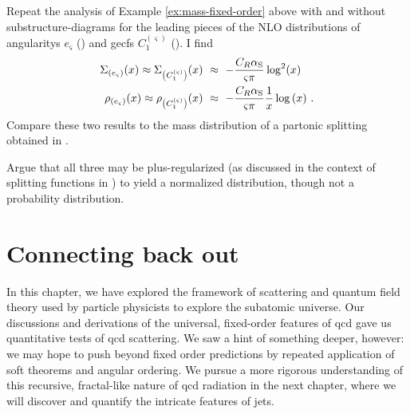 \begin{exercise}{}
    Repeat the analysis of Example \ref{ex:mass-fixed-order} above with and without \glspl{substructure-diagram} for the leading pieces of the NLO distributions of \glspl{angularity} \(e_\varsigma\) () and \glspl{gecf} \(C_1^{(\varsigma)}\) ().
    I find
    \begin{align}
        \Sigma_{\left(e_\varsigma\right)}(x)
        \approx
        \Sigma_{\left(C_1^{(\varsigma)}\right)}(x)
        \,\,
        &\approx
        \,\,
        -\frac{C_R\alpha_{\rm S}}{\varsigma \pi}\log^2(x)
        \\
        \rho_{\left(e_\varsigma\right)}(x)
        \approx
        \rho_{\left(C_1^{(\varsigma)}\right)}(x)
        \,\,
        &\approx
        \,\,
        -\frac{C_R\alpha_{\rm S}}{\varsigma \pi} \frac{1}{x}
        \log\left(x\right)
        \,.
    \end{align}
    Compare these two results to the mass distribution of a partonic splitting obtained in .

    Argue that all three may be plus-regularized (as discussed in the context of splitting functions in ) to yield a normalized distribution, though not a probability distribution.
\end{exercise}




\section{Connecting back out}

In this chapter, we have explored the framework of scattering and quantum field theory used by particle physicists to explore the subatomic universe.
%
Our discussions and derivations of the universal, fixed-order features of \gls{qcd} gave us quantitative tests of \gls{qcd} scattering.
%
We saw a hint of something deeper, however:
%
we may hope to push beyond fixed order predictions by repeated application of soft theorems and angular ordering.
%
We pursue a more rigorous understanding of this recursive, fractal-like nature of \gls{qcd} radiation in the next chapter, where we will discover and quantify the intricate features of jets.



